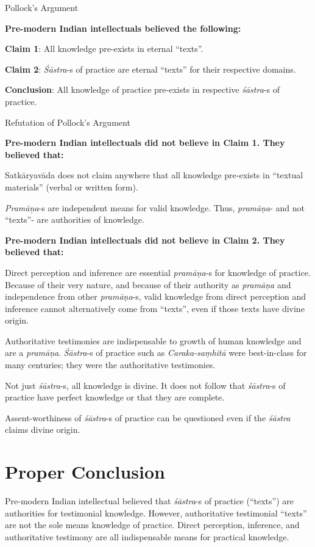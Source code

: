 Pollock's Argument

{\bf Pre-modern Indian intellectuals believed the following:}

{\bf Claim 1}: All knowledge pre-exists in eternal ``texts''.  

{\bf Claim 2}: {\sl Śāstra}-s of practice are eternal ``texts'' for their respective domains.

{\bf Conclusion}:  All knowledge of practice pre-exists in respective {\sl śāstra}-s of practice. 

Refutation of Pollock's Argument

{\bf Pre-modern Indian intellectuals did not believe in Claim 1.  They believed that:}

Satkāryavāda does not claim anywhere that all knowledge pre-exists in ``textual materials'' (verbal or written form).

{\sl Pramāņa}-s are independent means for valid knowledge. Thus, {\sl pramāṇa}- and not ``texts''- are authorities of knowledge.

{\bf Pre-modern Indian intellectuals did not believe in Claim 2.  They believed that:}

\newpage

Direct perception and inference are essential {\sl pramāṇa}-s for knowledge of practice.  Because of their very nature, and because of their authority as {\sl pramāṇa} and independence from other {\sl pramāṇa}-s, valid knowledge from direct perception and inference cannot alternatively come from ``texts'', even if those texts have divine origin.

Authoritative testimonies are indispensable to growth of human knowledge and are a {\sl pramāṇa}.  {\sl Śāstra}-s of practice such as {\sl Caraka-saṃhitā} were best-in-class for many centuries; they were the authoritative testimonies.

Not just {\sl śāstra}-s, all knowledge is divine. It does not follow that {\sl śāstra}-s of practice have perfect knowledge or that they are complete.

Assent-worthiness of {\sl śāstra}-s of practice can be questioned even if the {\sl śāstra} claims divine origin.

\section*{Proper Conclusion}

Pre-modern Indian intellectual believed that {\sl śāstra}-s of practice (``texts'') are authorities for testimonial knowledge. However, authoritative testimonial ``texts'' are not the sole means knowledge of practice. Direct perception, inference, and authoritative testimony are all indispensable means for practical knowledge.

